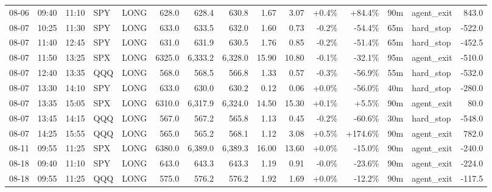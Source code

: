 \documentclass[11pt,a4paper,twoside]{article}
\begin{document}
\begin{landscape}
\begin{center}
\begin{longtable}{>{\color{txtmain}}l l l l l r r r r r r r r >{\color{txtmain}}l r}
08-06 & 09:40 & 11:10 & SPY & LONG & 628.0 & 628.4 & 630.8 & 1.67 & 3.07 & \textcolor{wingreen}{+0.4\%} & \textcolor{wingreen}{+84.4\%} & 90m & agent\_exit & \textcolor{wingreen}{843.0} \\
08-07 & 10:25 & 11:30 & SPY & LONG & 633.0 & 633.5 & 632.0 & 1.60 & 0.73 & \textcolor{lossred}{-0.2\%} & \textcolor{lossred}{-54.4\%} & 65m & hard\_stop & \textcolor{lossred}{-522.0} \\
08-07 & 11:40 & 12:45 & SPY & LONG & 631.0 & 631.9 & 630.5 & 1.76 & 0.85 & \textcolor{lossred}{-0.2\%} & \textcolor{lossred}{-51.4\%} & 65m & hard\_stop & \textcolor{lossred}{-452.5} \\
08-07 & 11:50 & 13:25 & SPX & LONG & 6325.0 & 6,333.2 & 6,328.0 & 15.90 & 10.80 & \textcolor{lossred}{-0.1\%} & \textcolor{lossred}{-32.1\%} & 95m & agent\_exit & \textcolor{lossred}{-510.0} \\
08-07 & 12:40 & 13:35 & QQQ & LONG & 568.0 & 568.5 & 566.8 & 1.33 & 0.57 & \textcolor{lossred}{-0.3\%} & \textcolor{lossred}{-56.9\%} & 55m & hard\_stop & \textcolor{lossred}{-532.0} \\
08-07 & 13:30 & 14:10 & SPY & LONG & 633.0 & 630.0 & 630.2 & 0.12 & 0.06 & \textcolor{wingreen}{+0.0\%} & \textcolor{lossred}{-56.0\%} & 40m & hard\_stop & \textcolor{lossred}{-280.0} \\
08-07 & 13:35 & 15:05 & SPX & LONG & 6310.0 & 6,317.9 & 6,324.0 & 14.50 & 15.30 & \textcolor{wingreen}{+0.1\%} & \textcolor{wingreen}{+5.5\%} & 90m & agent\_exit & \textcolor{wingreen}{80.0} \\
08-07 & 13:45 & 14:15 & QQQ & LONG & 567.0 & 567.2 & 565.8 & 1.13 & 0.45 & \textcolor{lossred}{-0.2\%} & \textcolor{lossred}{-60.6\%} & 30m & hard\_stop & \textcolor{lossred}{-548.0} \\
08-07 & 14:25 & 15:55 & QQQ & LONG & 565.0 & 565.2 & 568.1 & 1.12 & 3.08 & \textcolor{wingreen}{+0.5\%} & \textcolor{wingreen}{+174.6\%} & 90m & agent\_exit & \textcolor{wingreen}{782.0} \\
08-11 & 09:55 & 11:25 & SPX & LONG & 6380.0 & 6,389.0 & 6,389.3 & 16.00 & 13.60 & \textcolor{wingreen}{+0.0\%} & \textcolor{lossred}{-15.0\%} & 90m & agent\_exit & \textcolor{lossred}{-240.0} \\
08-18 & 09:40 & 11:10 & SPY & LONG & 643.0 & 643.3 & 643.3 & 1.19 & 0.91 & \textcolor{lossred}{-0.0\%} & \textcolor{lossred}{-23.6\%} & 90m & agent\_exit & \textcolor{lossred}{-224.0} \\
08-18 & 09:55 & 11:25 & QQQ & LONG & 575.0 & 576.2 & 576.2 & 1.92 & 1.69 & \textcolor{wingreen}{+0.0\%} & \textcolor{lossred}{-12.2\%} & 90m & agent\_exit & \textcolor{lossred}{-117.5} \\

\end{longtable}
\end{center}
\end{landscape}
\end{document}
